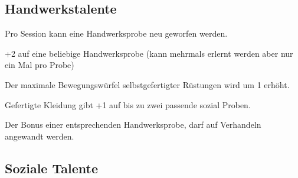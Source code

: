 \documentclass[../../Heldenanleitung2]{subfiles}
\begin{document}
\subsection{Handwerkstalente}
\begin{multicols}{2}
\begin{tcolorbox}[title={Handwerker},colbacktitle=orange, coltitle=black]    
   Pro Session kann eine Handwerksprobe neu geworfen werden.
\end{tcolorbox}

\begin{tcolorbox}[title={Handwerksfokus},colbacktitle=orange, coltitle=black]    
   +2 auf eine beliebige Handwerksprobe (kann mehrmals erlernt werden aber nur ein Mal pro Probe)
\end{tcolorbox}



\begin{tcolorbox}[title={Passgenau},colbacktitle=orange, coltitle=black]    
   Der maximale Bewegungswürfel selbstgefertigter Rüstungen wird um 1 erhöht.
\end{tcolorbox}

\begin{tcolorbox}[title={Schönes Handwerk},colbacktitle=orange, coltitle=black]    
   Gefertigte Kleidung gibt +1 auf bis zu zwei passende sozial Proben.
\end{tcolorbox}

\begin{tcolorbox}[title={Fachwissen},colbacktitle=orange, coltitle=black]    
   Der Bonus einer entsprechenden Handwerksprobe, darf auf Verhandeln angewandt werden.
\end{tcolorbox}

\end{multicols}

\subsection{Soziale Talente}
\end{document}
